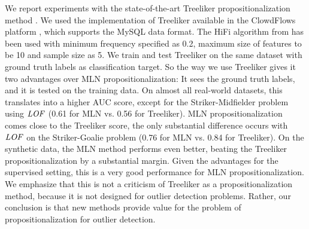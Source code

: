 			We report experiments with the state-of-the-art Treeliker propositionalization method \cite{kuzelka2008}. We used the implementation of Treeliker available in the ClowdFlows platform \cite{Kranjc2012}, which supports the MySQL data format. The HiFi algorithm from \cite{kuzelka2008} has been used with minimum frequency specified as 0.2, maximum size of features to be 10 and sample size as 5. We train and test Treeliker on the same dataset with ground truth labels as classification target. So the way we use Treeliker gives it two advantages over MLN propositionalization: It sees the ground truth labels, and it is tested on the training data. On almost all real-world datasets, this translates into a higher AUC score, except for the Striker-Midfielder problem using $\it{LOF}$ (0.61 for MLN vs. 0.56 for Treeliker). MLN propositionalization comes close to the Treeliker score, the only substantial difference occurs with $\it{LOF}$ on the Striker-Goalie problem (0.76 for MLN vs. 0.84 for Treeliker).  On the synthetic data, the MLN method performs even better, beating the Treeliker propositionalization by a substantial margin. Given the advantages for the supervised setting, this is a very good performance for MLN propositionalization. We emphasize that this is not a criticism of Treeliker as a propositionalization method, because it is not designed for outlier detection problems. Rather, our conclusion is that new methods provide value for the problem of propositionalization for outlier detection. 
			
